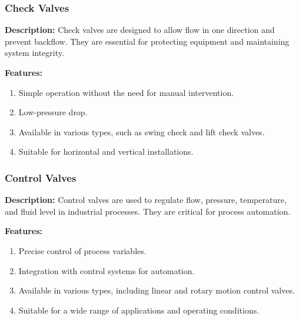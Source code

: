 \subsubsection{Check Valves}

\textbf{Description:} Check valves are designed to allow flow in one direction and prevent backflow. They are essential for protecting equipment and maintaining system integrity.

\textbf{Features:}
\begin{enumerate}
    \item Simple operation without the need for manual intervention.
    \item Low-pressure drop.
    \item Available in various types, such as swing check and lift check valves.
    \item Suitable for horizontal and vertical installations.
\end{enumerate}

\subsubsection{Control Valves}

\textbf{Description:} Control valves are used to regulate flow, pressure, temperature, and fluid level in industrial processes. They are critical for process automation.

\textbf{Features:}
\begin{enumerate}
    \item Precise control of process variables.
    \item Integration with control systems for automation.
    \item Available in various types, including linear and rotary motion control valves.
    \item Suitable for a wide range of applications and operating conditions.
\end{enumerate}